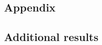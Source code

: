 \documentclass[aspectratio=169,xcolor=dvipsnames, 11pt,mathserif]{beamer}
\begin{document}
\begin{framefont}{\small}
\appendix
\section{Appendix}

\subsection{Additional results}



\end{framefont}
\end{document}
